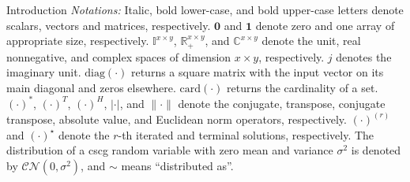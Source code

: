 \documentclass[journal]{IEEEtran}
\begin{document}
\begin{section}{Introduction}
	\emph{Notations:}
	Italic, bold lower-case, and bold upper-case letters denote scalars, vectors and matrices, respectively.
	$\boldsymbol{0}$ and $\boldsymbol{1}$ denote zero and one array of appropriate size, respectively. $\mathbb{I}^{x \times y}$, $\mathbb{R}_+^{x \times y}$, and $\mathbb{C}^{x \times y}$ denote the unit, real nonnegative, and complex spaces of dimension $x \times y$, respectively.
	$j$ denotes the imaginary unit.
	$\mathrm{diag}(\cdot)$ returns a square matrix with the input vector on its main diagonal and zeros elsewhere.
	$\mathrm{card}(\cdot)$ returns the cardinality of a set.
	$(\cdot)^*$, $(\cdot)^T$, $(\cdot)^H$, $\lvert{\cdot}\rvert$, and $\lVert{\cdot}\rVert$ denote the conjugate, transpose, conjugate transpose, absolute value, and Euclidean norm operators, respectively.
	$(\cdot)^{(r)}$ and $(\cdot)^{\star}$ denote the $r$-th iterated and terminal solutions, respectively.
	The distribution of a \gls{cscg} random variable with zero mean and variance $\sigma^2$ is denoted by $\mathcal{CN}(0,\sigma^2)$, and $\sim$ means ``distributed as''.
\end{section}
\end{document}
